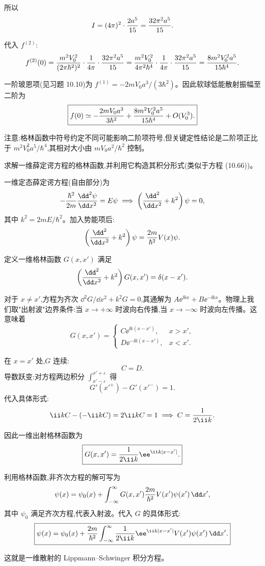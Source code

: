 \begin{solution}
所以
\[
I=(4\pi)^2\cdot{2a^5\over15}={32\pi^2 a^5\over15}.
\]

代入 $f^{(2)}$:
\[
f^{(2)}(0)={m^2V_0^2\over(2\pi\hbar^2)^2}\cdot{1\over4\pi}\cdot{32\pi^2 a^5\over15}
={m^2V_0^2\over4\pi^2\hbar^4}\cdot{1\over4\pi}\cdot{32\pi^2 a^5\over15}
={8m^2V_0^2a^5\over15\hbar^4}.
\]

一阶玻恩项(见习题 10.10)为 $f^{(1)}=-2mV_0a^3/(3\hbar^2)$。因此软球低能散射振幅至二阶为
\[
\boxed{f(0)\simeq-{2mV_0a^3\over3\hbar^2}+{8m^2V_0^2a^5\over15\hbar^4}+O(V_0^3).}
\]

注意:格林函数中符号约定不同可能影响二阶项符号,但关键定性结论是二阶项正比于 $m^2V_0^2a^5/\hbar^4$,其相对大小由 $mV_0a^2/\hbar^2$ 控制。
\end{solution}

\begin{question}
求解一维薛定谔方程的格林函数,并利用它构造其积分形式(类似于方程 (10.66))。

\par\smallskip
{}

\end{question}
\begin{solution}
一维定态薛定谔方程(自由部分)为
\[
-{\hbar^2\over2m}{\dd^2\psi\over\dd x^2}=E\psi
\;\Longrightarrow\;
\left({\dd^2\over\dd x^2}+k^2\right)\psi=0,
\]
其中 $k^2=2mE/\hbar^2$。加入势能项后:
\[
\left({\dd^2\over\dd x^2}+k^2\right)\psi={2m\over\hbar^2}V(x)\psi.
\]

定义一维格林函数 $G(x,x')$ 满足
\[
\left({\dd^2\over\dd x^2}+k^2\right)G(x,x')=\delta(x-x').
\]

对于 $x\neq x'$,方程为齐次 $\dd^2G/\dd x^2+k^2G=0$,其通解为 $A\ee^{\ii kx}+B\ee^{-\ii kx}$。物理上我们取"出射波"边界条件:当 $x\to+\infty$ 时波向右传播,当 $x\to-\infty$ 时波向左传播。这意味着
\[
G(x,x')=\begin{cases}
C \ee^{\ii k(x-x')}, & x>x',\\
D \ee^{-\ii k(x-x')}, & x<x'.
\end{cases}
\]

在 $x=x'$ 处,$G$ 连续:
\[
C=D.
\]
导数跃变:对方程两边积分 $\int_{x'-\varepsilon}^{x'+\varepsilon}$ 得
\[
G'(x'^+)-G'(x'^-)=1.
\]
代入具体形式:
\[
\ii k C-(-\ii k C)=2\ii k C=1\;\Longrightarrow\;C={1\over2\ii k}.
\]

因此一维出射格林函数为
\[
\boxed{G(x,x')={1\over2\ii k}\ee^{\ii k|x-x'|}.}
\]

利用格林函数,非齐次方程的解可写为
\[
\psi(x)=\psi_0(x)+\int_{-\infty}^{\infty}G(x,x'){2m\over\hbar^2}V(x')\psi(x')\,\dd x',
\]
其中 $\psi_0$ 满足齐次方程,代表入射波。代入 $G$ 的具体形式:
\[
\boxed{\psi(x)=\psi_0(x)+{2m\over\hbar^2}\int_{-\infty}^{\infty}{1\over2\ii k}\ee^{\ii k|x-x'|}V(x')\psi(x')\,\dd x'.}
\]

这就是一维散射的 Lippmann--Schwinger 积分方程。
\end{solution}

